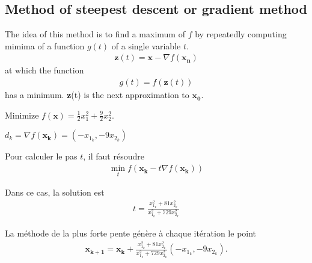 \subsection{Method of steepest descent or gradient method}
The idea of this method is to find a maximum of $f$ by repeatedly computing mimima of a function $g(t)$ of a single variable $t$.
\begin{eqnarray}
	\mathbf{z}(t)=\mathbf{x}-\nabla f(\mathbf{x_n})
\end{eqnarray} 
at which the function
\begin{eqnarray}
	g(t)=f(\mathbf{z}(t))
\end{eqnarray}
has a minimum. \textbf{z}(t) is the next approximation to $\mathbf{x_0}$.

\begin{myExample}
	Minimize $f(\mathbf{x})=\frac{1}{2}x_1^2+\frac{9}{2}x_2^2$.
	
	$d_k = \nabla f(\mathbf{x_k})=(-x_{1_k},-9x_{2_k})$
	
	Pour calculer le pas $t$, il faut résoudre
	\begin{eqnarray*}
		\min_t f(\mathbf{x_k}-t\nabla f(\mathbf{x_k}))
	\end{eqnarray*}
	
	Dans ce cas, la solution est
	\begin{eqnarray*}
		t=\frac{x_{1_k}^2+81x_{2_k}^2}{x_{1_k}^2+729x_{2_k}^2}
	\end{eqnarray*}
	
	La méthode de la plus forte pente génère à chaque itération le point
	\begin{eqnarray*}
		\mathbf{x_{k+1}}=\mathbf{x_k}+\frac{x_{1_k}^2+81x_{2_k}^2}{x_{1_k}^2+729x_{2_k}^2}(-x_{1_k},-9x_{2_k}).
	\end{eqnarray*}
\end{myExample}

